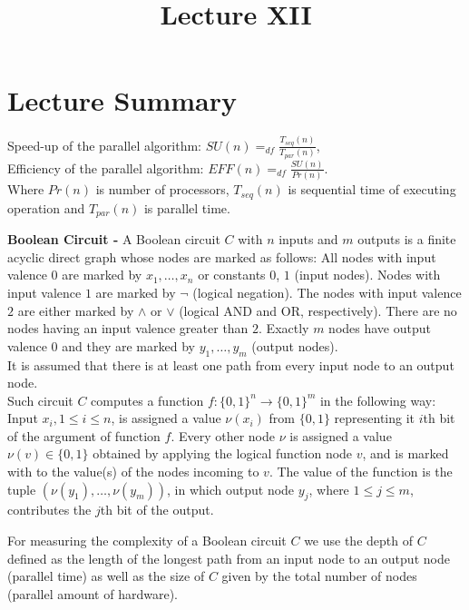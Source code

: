 \documentclass[a4paper]{article}
\title{\vspace{-2cm}Lecture XII\vspace{-2cm}}
\date{}
\begin{document}
\maketitle
\section{Lecture Summary}
Speed-up of the parallel algorithm: $SU(n) =_{df} \frac{T_{seq}(n)}{T_{par}(n)}$, \\
Efficiency of the parallel algorithm: $EFF(n) =_{df} \frac{SU(n)}{Pr(n)}$. \\
Where $Pr(n)$ is number of processors, $T_{seq}(n)$ is sequential time of executing operation and $T_{par}(n)$ is parallel time.
\begin{definition}
\textbf{Boolean Circuit -} A Boolean circuit $C$ with $n$ inputs and $m$ outputs is a finite acyclic direct graph whose nodes are marked as follows: All nodes with input valence $0$ are marked by $x_{1}, \ldots, x_{n}$ or constants $0$, $1$ (input nodes). Nodes with input valence $1$ are marked by $\lnot$ (logical negation). The nodes with input valence $2$ are either marked by $\land$ or $\lor$ (logical AND and OR, respectively). There are no nodes having an input valence greater than $2$. Exactly $m$ nodes have output valence $0$ and they are marked by $y_{1}, \ldots, y_{m}$ (output nodes). \\
It is assumed that there is at least one path from every input node to an output node. \\
Such circuit $C$ computes a function $f: \{ 0, 1 \}^{n} \rightarrow \{ 0, 1 \}^{m}$ in the following way: Input $x_{i}, 1 \leq i \leq n$, is assigned a value $\nu (x_{i})$ from $\{ 0, 1 \}$ representing it $i$th bit of the argument of function $f$. Every other node $\nu$ is assigned a value $\nu (v) \in \{ 0, 1 \}$ obtained by applying the logical function node $v$, and is marked with to the value(s) of the nodes incoming to $v$. The value of the function is the tuple $(\nu(y_{1}), \ldots, \nu(y_{m}))$, in which output node $y_{j}$, where $1 \leq j \leq m$, contributes the $j$th bit of the output.
\end{definition}


\begin{definition}
For measuring the complexity of a Boolean circuit $C$ we use the depth of $C$ defined as the length of the longest path from an input node to an output node (parallel time) as well as the size of $C$ given by the total number of nodes (parallel amount of hardware).
\end{definition}
\end{document}
